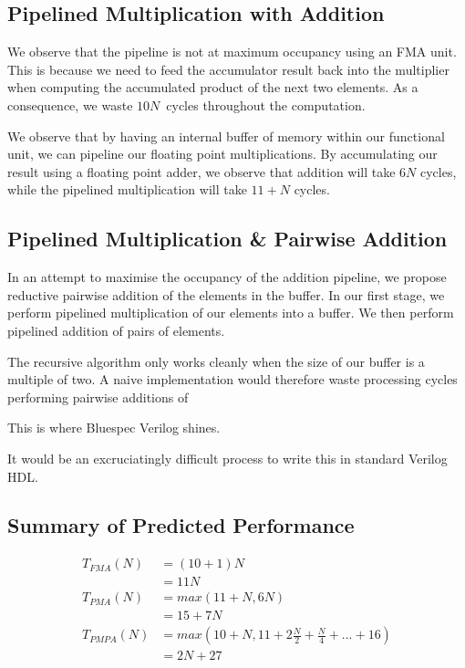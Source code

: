 \documentclass[a4paper,8pt]{report}
\begin{document}
\subsection{Pipelined Multiplication with Addition}
We observe that the pipeline is not at maximum occupancy using an FMA unit. This
is because we need to feed the accumulator result back into the multiplier when
computing the accumulated product of the next two elements. As a consequence, we
waste $10N$~cycles throughout the computation.

We observe that by having an internal buffer of memory within our functional
unit, we can pipeline our floating point multiplications. By accumulating our
result using a floating point adder, we observe that addition will take $6N$
cycles, while the pipelined multiplication will take $11+N$ cycles.


\subsection{Pipelined Multiplication \& Pairwise Addition}
In an attempt to maximise the occupancy of the addition pipeline, we propose
reductive pairwise addition of the elements in the buffer. In our first stage,
we perform pipelined multiplication of our elements into a buffer. We then
perform pipelined addition of pairs of elements.

The recursive algorithm only works cleanly when the size of our buffer is a
multiple of two. A naive implementation would therefore waste processing cycles
performing pairwise additions of 

This is where Bluespec Verilog shines. 

It would be an excruciatingly difficult process to write this in standard
Verilog HDL. 



\subsection{Summary of Predicted Performance}

\begin{align*}
  T_{FMA}(N) &= (10+1)N \\
             &= 11N \\
  T_{PMA}(N) &= max(11+N, 6N) \\
               &= 15 + 7N \\
  T_{PMPA}(N) &= max(10+N, 11+2\frac{N}{2} + \frac{N}{4} + ... + 16) \\
               &= 2N+27  
\end{align*}
\end{document}
